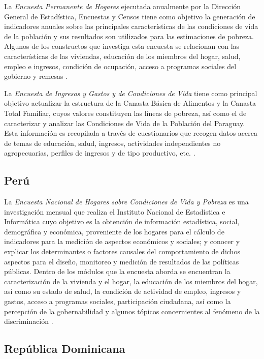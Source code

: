 La \emph{Encuesta Permanente de Hogares} ejecutada anualmente por la Dirección General de Estadística, Encuestas y Censos tiene como objetivo la generación de indicadores anuales sobre las principales características de las condiciones de vida de la población y sus resultados son utilizados para las estimaciones de pobreza. Algunos de los constructos que investiga esta encuesta se relacionan con las características de las viviendas, educación de los miembros del hogar, salud, empleo e ingresos, condición de ocupación, acceso a programas sociales del gobierno y remesas \citep{DGEEC-PY}.

La \emph{Encuesta de Ingresos y Gastos y de Condiciones de Vida} tiene como principal objetivo actualizar la estructura de la Canasta Básica de Alimentos y la Canasta Total Familiar, cuyos valores constituyen las líneas de pobreza, así como el de caracterizar y analizar las Condiciones de Vida de la Población del Paraguay. Esta información es recopilada a través de cuestionarios que recogen datos acerca de temas de educación, salud, ingresos, actividades independientes no agropecuarias, perfiles de ingresos y de tipo productivo, etc. \citep{DGEEC2-PY}.

\hypertarget{peru}{%
\subsection*{Perú}\label{peru}}


La \emph{Encuesta Nacional de Hogares sobre Condiciones de Vida y Pobreza} es una investigación mensual que realiza el Instituto Nacional de Estadística e Informática cuyo objetivo es la obtención de información estadística, social, demográfica y económica, proveniente de los hogares para el cálculo de indicadores para la medición de aspectos económicos y sociales; y conocer y explicar los determinantes o factores causales del comportamiento de dichos aspectos para el diseño, monitoreo y medición de resultados de las políticas públicas. Dentro de los módulos que la encuesta aborda se encuentran la caracterización de la vivienda y el hogar, la educación de los miembros del hogar, así como su estado de salud, la condición de actividad de empleo, ingresos y gastos, acceso a programas sociales, participación ciudadana, así como la percepción de la gobernabilidad y algunos tópicos concernientes al fenómeno de la discriminación \citep{INEI-PE_2016}.

\hypertarget{republica-dominicana}{%
\subsection*{República Dominicana}\label{republica-dominicana}}


